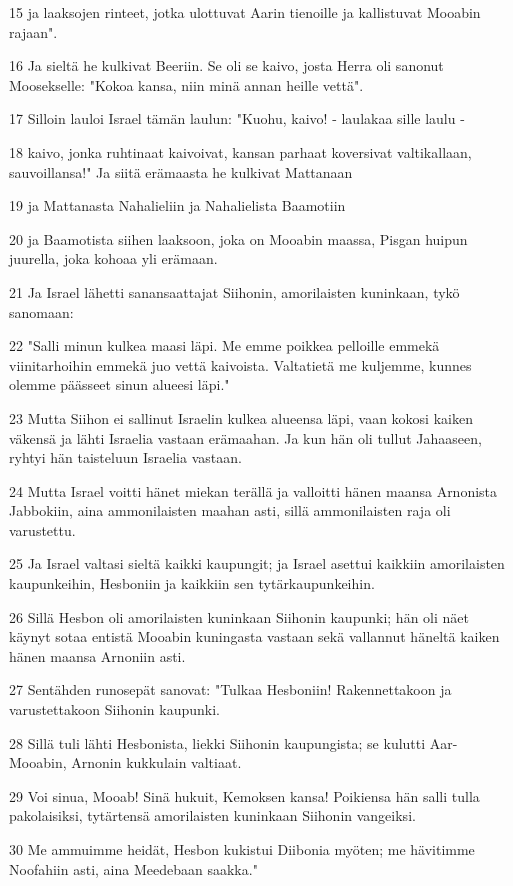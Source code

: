 \par 15 ja laaksojen rinteet, jotka ulottuvat Aarin tienoille ja kallistuvat Mooabin rajaan".
\par 16 Ja sieltä he kulkivat Beeriin. Se oli se kaivo, josta Herra oli sanonut Moosekselle: "Kokoa kansa, niin minä annan heille vettä".
\par 17 Silloin lauloi Israel tämän laulun: "Kuohu, kaivo! - laulakaa sille laulu -
\par 18 kaivo, jonka ruhtinaat kaivoivat, kansan parhaat koversivat valtikallaan, sauvoillansa!" Ja siitä erämaasta he kulkivat Mattanaan
\par 19 ja Mattanasta Nahalieliin ja Nahalielista Baamotiin
\par 20 ja Baamotista siihen laaksoon, joka on Mooabin maassa, Pisgan huipun juurella, joka kohoaa yli erämaan.
\par 21 Ja Israel lähetti sanansaattajat Siihonin, amorilaisten kuninkaan, tykö sanomaan:
\par 22 "Salli minun kulkea maasi läpi. Me emme poikkea pelloille emmekä viinitarhoihin emmekä juo vettä kaivoista. Valtatietä me kuljemme, kunnes olemme päässeet sinun alueesi läpi."
\par 23 Mutta Siihon ei sallinut Israelin kulkea alueensa läpi, vaan kokosi kaiken väkensä ja lähti Israelia vastaan erämaahan. Ja kun hän oli tullut Jahaaseen, ryhtyi hän taisteluun Israelia vastaan.
\par 24 Mutta Israel voitti hänet miekan terällä ja valloitti hänen maansa Arnonista Jabbokiin, aina ammonilaisten maahan asti, sillä ammonilaisten raja oli varustettu.
\par 25 Ja Israel valtasi sieltä kaikki kaupungit; ja Israel asettui kaikkiin amorilaisten kaupunkeihin, Hesboniin ja kaikkiin sen tytärkaupunkeihin.
\par 26 Sillä Hesbon oli amorilaisten kuninkaan Siihonin kaupunki; hän oli näet käynyt sotaa entistä Mooabin kuningasta vastaan sekä vallannut häneltä kaiken hänen maansa Arnoniin asti.
\par 27 Sentähden runosepät sanovat: "Tulkaa Hesboniin! Rakennettakoon ja varustettakoon Siihonin kaupunki.
\par 28 Sillä tuli lähti Hesbonista, liekki Siihonin kaupungista; se kulutti Aar-Mooabin, Arnonin kukkulain valtiaat.
\par 29 Voi sinua, Mooab! Sinä hukuit, Kemoksen kansa! Poikiensa hän salli tulla pakolaisiksi, tytärtensä amorilaisten kuninkaan Siihonin vangeiksi.
\par 30 Me ammuimme heidät, Hesbon kukistui Diibonia myöten; me hävitimme Noofahiin asti, aina Meedebaan saakka."
